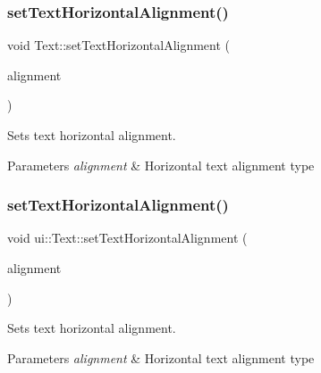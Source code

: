 \subsubsection{\texorpdfstring{set\+Text\+Horizontal\+Alignment()}{setTextHorizontalAlignment()}\hspace{0.1cm}{\footnotesize\ttfamily [1/2]}}
{\footnotesize\ttfamily void Text\+::set\+Text\+Horizontal\+Alignment (\begin{DoxyParamCaption}\item[{Text\+H\+Alignment}]{alignment }\end{DoxyParamCaption})}

Sets text horizontal alignment.


\begin{DoxyParams}{Parameters}
{\em alignment} & Horizontal text alignment type \\
\hline
\end{DoxyParams}
\mbox{\label{classui_1_1Text_a5adf856f6010e9d51ec8489755798f29}} 
\subsubsection{\texorpdfstring{set\+Text\+Horizontal\+Alignment()}{setTextHorizontalAlignment()}\hspace{0.1cm}{\footnotesize\ttfamily [2/2]}}
{\footnotesize\ttfamily void ui\+::\+Text\+::set\+Text\+Horizontal\+Alignment (\begin{DoxyParamCaption}\item[{Text\+H\+Alignment}]{alignment }\end{DoxyParamCaption})}

Sets text horizontal alignment.


\begin{DoxyParams}{Parameters}
{\em alignment} & Horizontal text alignment type \\
\hline
\end{DoxyParams}
\mbox{\label{classui_1_1Text_ab38e94ca471d5d21dfd9fc66311efcd5}} 
